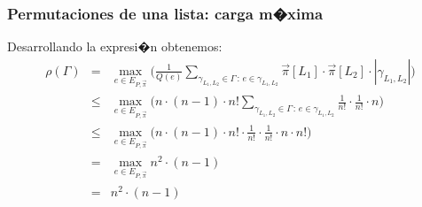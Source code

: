 \documentclass{beamer}
\newcommand{\vs}[1]{\vspace{#1mm}}
\begin{document}
	
	
	\begin{frame}
		\frametitle{Permutaciones de una lista: carga m�xima}
		
		{\small
			Desarrollando la expresi�n obtenemos:
			\begin{eqnarray*}
				\rho(\Gamma) & = & \max_{e \in E_{P,\vec \pi}} \bigg(\frac{1}{Q(e)} \sum_{\gamma_{L_1,L_2} \in \Gamma \,:\, e \in \gamma_{L_1,L_2}} \vec \pi[L_1] \cdot \vec \pi[L_2] \cdot |\gamma_{L_1,L_2}|\bigg)\\
				& \leq &  \max_{e \in E_{P,\vec \pi}} \bigg(n \cdot (n-1) \cdot n! \sum_{\gamma_{L_1,L_2} \in \Gamma \,:\, e \in \gamma_{L_1,L_2}} \frac{1}{n!} \cdot \frac{1}{n!} \cdot n\bigg)\\
				& \leq &  \max_{e \in E_{P,\vec \pi}} \bigg(n \cdot (n-1) \cdot n! \cdot \frac{1}{n!} \cdot \frac{1}{n!} \cdot n \cdot n! \bigg)\\
				& = &  \max_{e \in E_{P,\vec \pi}} n^2 \cdot (n-1)\\
				& = & n^2 \cdot (n-1)
			\end{eqnarray*}
		}
	\end{frame}
	
\end{document}
